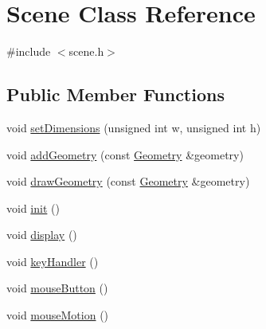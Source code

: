 \hypertarget{class_scene}{\section{Scene Class Reference}
\label{class_scene}
}


{\ttfamily \#include $<$scene.\+h$>$}

\subsection*{Public Member Functions}
\begin{DoxyCompactItemize}
\item 
void \hyperlink{class_scene_a42b1481ada95342cfb71d6a6e6bcc3c5}{set\+Dimensions} (unsigned int w, unsigned int h)
\item 
void \hyperlink{class_scene_acbf85916173784558177e62dfba7acb9}{add\+Geometry} (const \hyperlink{class_geometry}{Geometry} \&geometry)
\item 
void \hyperlink{class_scene_a5bdd3d2cbdd1defd8d46d05f9db85ee2}{draw\+Geometry} (const \hyperlink{class_geometry}{Geometry} \&geometry)
\item 
void \hyperlink{class_scene_abb3b6efc6fdba03cd96436edaf08a967}{init} ()
\item 
void \hyperlink{class_scene_ae1dc07ec420ecd407a3a47910438167a}{display} ()
\item 
void \hyperlink{class_scene_a59f325fa74a642ebeb27f59f0455e06e}{key\+Handler} ()
\item 
void \hyperlink{class_scene_aa7342d108ff80f49d39b89570d6be4aa}{mouse\+Button} ()
\item 
void \hyperlink{class_scene_a479536d524e9879442b9c59d3c8d7e2e}{mouse\+Motion} ()
\end{DoxyCompactItemize}
